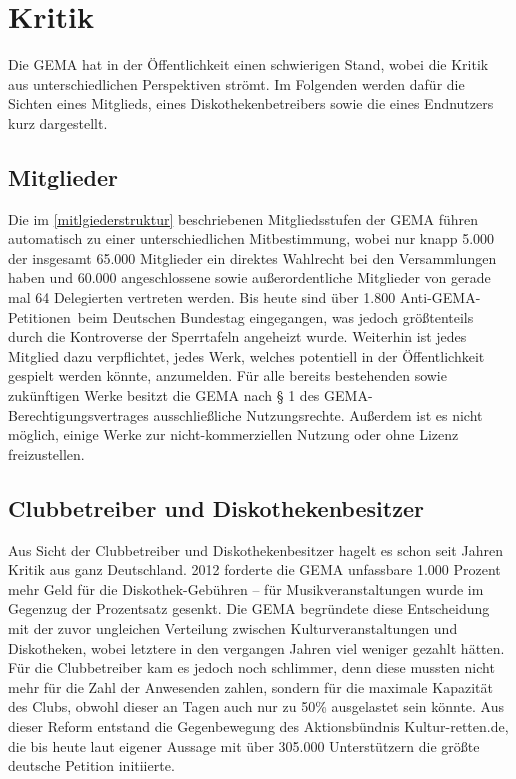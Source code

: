 \chapter{Kritik}
Die GEMA hat in der Öffentlichkeit einen schwierigen Stand, wobei die Kritik aus unterschiedlichen Perspektiven strömt. Im Folgenden werden dafür die Sichten eines Mitglieds, eines Diskothekenbetreibers sowie die eines Endnutzers kurz dargestellt.

\section{Mitglieder}

Die im \vref{mitlgiederstruktur} beschriebenen Mitgliedsstufen der GEMA führen automatisch zu einer unterschiedlichen Mitbestimmung, wobei nur knapp 5.000 der insgesamt 65.000 Mitglieder ein direktes Wahlrecht bei den Versammlungen haben und 60.000 angeschlossene sowie außerordentliche Mitglieder von gerade mal 64 Delegierten vertreten werden. Bis heute sind über 1.800 \glqq Anti-GEMA-Petitionen\grqq~beim Deutschen Bundestag eingegangen, was jedoch größtenteils durch die Kontroverse der Sperrtafeln angeheizt wurde. Weiterhin ist jedes Mitglied dazu verpflichtet, jedes Werk, welches potentiell in der Öffentlichkeit gespielt werden könnte, anzumelden. Für alle bereits bestehenden sowie zukünftigen Werke besitzt die GEMA nach § 1 des GEMA-Berechtigungsvertrages ausschließliche Nutzungsrechte. Außerdem ist es nicht möglich, einige Werke zur nicht-kommerziellen Nutzung oder ohne Lizenz freizustellen.

\section{Clubbetreiber und Diskothekenbesitzer}
Aus Sicht der Clubbetreiber und Diskothekenbesitzer hagelt es schon seit Jahren Kritik aus ganz Deutschland. 2012 forderte die GEMA unfassbare 1.000 Prozent mehr Geld für die Diskothek-Gebühren -- für Musikveranstaltungen wurde im Gegenzug der Prozentsatz gesenkt.  Die GEMA begründete diese Entscheidung mit der zuvor ungleichen Verteilung zwischen Kulturveranstaltungen und Diskotheken, wobei letztere in den vergangen Jahren viel weniger gezahlt hätten. Für die Clubbetreiber kam es jedoch noch schlimmer, denn diese mussten nicht mehr für die Zahl der Anwesenden zahlen, sondern für die maximale Kapazität des Clubs, obwohl dieser an Tagen auch nur zu 50\% ausgelastet sein könnte. Aus dieser Reform entstand die Gegenbewegung des Aktionsbündnis \glqq Kultur-retten.de\grqq, die bis heute laut eigener Aussage mit über 305.000 Unterstützern die größte deutsche Petition initiierte. 

